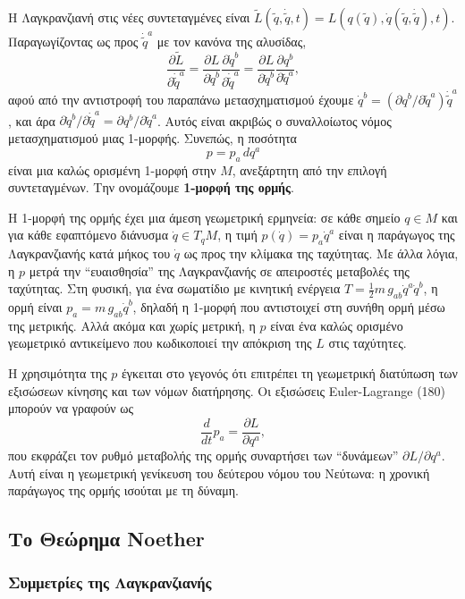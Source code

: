 \documentclass[12pt]{article}
\begin{document}
Η Λαγκρανζιανή στις νέες συντεταγμένες είναι $\tilde{L}(\tilde{q}, \dot{\tilde{q}}, t) = L(q(\tilde{q}), \dot{q}(\tilde{q}, \dot{\tilde{q}}), t)$. Παραγωγίζοντας ως προς $\dot{\tilde{q}}^a$ με τον κανόνα της αλυσίδας,
\[
\frac{\partial \tilde{L}}{\partial \dot{\tilde{q}}^a} = \frac{\partial L}{\partial \dot{q}^b} \frac{\partial \dot{q}^b}{\partial \dot{\tilde{q}}^a} = \frac{\partial L}{\partial \dot{q}^b} \frac{\partial q^b}{\partial \tilde{q}^a},
\]
αφού από την αντιστροφή του παραπάνω μετασχηματισμού έχουμε $\dot{q}^b = (\partial q^b / \partial \tilde{q}^a) \dot{\tilde{q}}^a$, και άρα $\partial \dot{q}^b / \partial \dot{\tilde{q}}^a = \partial q^b / \partial \tilde{q}^a$. Αυτός είναι ακριβώς ο συναλλοίωτος νόμος μετασχηματισμού μιας 1-μορφής. Συνεπώς, η ποσότητα
\[
p = p_a \, dq^a
\]
είναι μια καλώς ορισμένη 1-μορφή στην $M$, ανεξάρτητη από την επιλογή συντεταγμένων. Την ονομάζουμε \textbf{1-μορφή της ορμής}.

Η 1-μορφή της ορμής έχει μια άμεση γεωμετρική ερμηνεία: σε κάθε σημείο $q \in M$ και για κάθε εφαπτόμενο διάνυσμα $\dot{q} \in T_qM$, η τιμή $p(\dot{q}) = p_a \dot{q}^a$ είναι η παράγωγος της Λαγκρανζιανής κατά μήκος του $\dot{q}$ ως προς την κλίμακα της ταχύτητας. Με άλλα λόγια, η $p$ μετρά την ``ευαισθησία'' της Λαγκρανζιανής σε απειροστές μεταβολές της ταχύτητας. Στη φυσική, για ένα σωματίδιο με κινητική ενέργεια $T = \frac{1}{2} m \, g_{ab} \dot{q}^a \dot{q}^b$, η ορμή είναι $p_a = m \, g_{ab} \dot{q}^b$, δηλαδή η 1-μορφή που αντιστοιχεί στη συνήθη ορμή μέσω της μετρικής. Αλλά ακόμα και χωρίς μετρική, η $p$ είναι ένα καλώς ορισμένο γεωμετρικό αντικείμενο που κωδικοποιεί την απόκριση της $L$ στις ταχύτητες.

Η χρησιμότητα της $p$ έγκειται στο γεγονός ότι επιτρέπει τη γεωμετρική διατύπωση των εξισώσεων κίνησης και των νόμων διατήρησης. Οι εξισώσεις Euler-Lagrange (180) μπορούν να γραφούν ως
\[
\frac{d}{dt} p_a = \frac{\partial L}{\partial q^a},
\]
που εκφράζει τον ρυθμό μεταβολής της ορμής συναρτήσει των ``δυνάμεων'' $\partial L / \partial q^a$. Αυτή είναι η γεωμετρική γενίκευση του δεύτερου νόμου του Νεύτωνα: η χρονική παράγωγος της ορμής ισούται με τη δύναμη.

\subsection{Το Θεώρημα Noether}

\subsubsection{Συμμετρίες της Λαγκρανζιανής}
\end{document}
